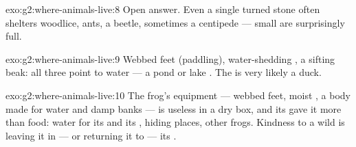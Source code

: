 \begin{solution}{exo:g2:where-animals-live:8}
Open answer. Even a single turned stone often shelters woodlice,
ants, a beetle, sometimes a centipede --- small  are
surprisingly full.
\end{solution}

\begin{solution}{exo:g2:where-animals-live:9}
Webbed feet (paddling), water-shedding , a sifting beak:
all three point to water --- a pond or lake . The 
is very likely a duck.
\end{solution}

\begin{solution}{exo:g2:where-animals-live:10}
The frog's equipment --- webbed feet, moist , a body made for
water and damp banks --- is useless in a dry box, and its 
gave it more than food: water for its  and its , hiding
places, other frogs. Kindness to a wild  is leaving it in
--- or returning it to --- its .
\end{solution}
